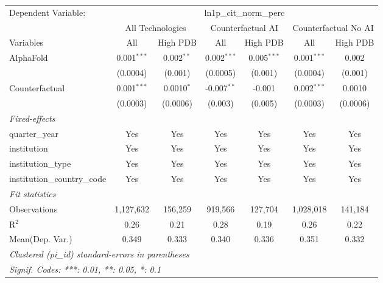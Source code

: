 \begingroup
\centering
\begin{tabular}{lcccccc}
   \tabularnewline \midrule \midrule
   Dependent Variable: & \multicolumn{6}{c}{ln1p\_cit\_norm\_perc}\\
 & \multicolumn{2}{c}{All Technologies} & \multicolumn{2}{c}{Counterfactual AI} & \multicolumn{2}{c}{Counterfactual No AI} \\
\cmidrule(lr){1-1}\cmidrule(lr){2-3} \cmidrule(lr){4-5} \cmidrule(lr){6-7}
Variables & \multicolumn{1}{c}{All} & \multicolumn{1}{c}{High PDB} & \multicolumn{1}{c}{All} & \multicolumn{1}{c}{High PDB} & \multicolumn{1}{c}{All} & \multicolumn{1}{c}{High PDB} \\
\cmidrule(lr){1-1}\cmidrule(lr){2-2} \cmidrule(lr){3-3} \cmidrule(lr){4-4} \cmidrule(lr){5-5} \cmidrule(lr){6-6} \cmidrule(lr){7-7}
   AlphaFold                    & 0.001$^{***}$ & 0.002$^{**}$ & 0.002$^{***}$ & 0.005$^{***}$ & 0.001$^{***}$ & 0.002\\   
                                & (0.0004)      & (0.001)      & (0.0005)      & (0.001)       & (0.0004)      & (0.001)\\   
   Counterfactual               & 0.001$^{***}$ & 0.0010$^{*}$ & -0.007$^{**}$ & -0.001        & 0.002$^{***}$ & 0.0010\\   
                                & (0.0003)      & (0.0006)     & (0.003)       & (0.005)       & (0.0003)      & (0.0006)\\   
   \midrule
   \emph{Fixed-effects}\\
   quarter\_year                & Yes           & Yes          & Yes           & Yes           & Yes           & Yes\\  
   institution                  & Yes           & Yes          & Yes           & Yes           & Yes           & Yes\\  
   institution\_type            & Yes           & Yes          & Yes           & Yes           & Yes           & Yes\\  
   institution\_country\_code   & Yes           & Yes          & Yes           & Yes           & Yes           & Yes\\  
   \midrule
   \emph{Fit statistics}\\
   Observations                 & 1,127,632     & 156,259      & 919,566       & 127,704       & 1,028,018     & 141,184\\  
   R$^2$                        & 0.26          & 0.21         & 0.28          & 0.19          & 0.26          & 0.22\\  
Mean(Dep. Var.) & 0.349 & 0.333 & 0.340 & 0.336 & 0.351 & 0.332 \\
   \midrule \midrule
   \multicolumn{7}{l}{\emph{Clustered (pi\_id) standard-errors in parentheses}}\\
   \multicolumn{7}{l}{\emph{Signif. Codes: ***: 0.01, **: 0.05, *: 0.1}}\\
\end{tabular}
\par\endgroup
